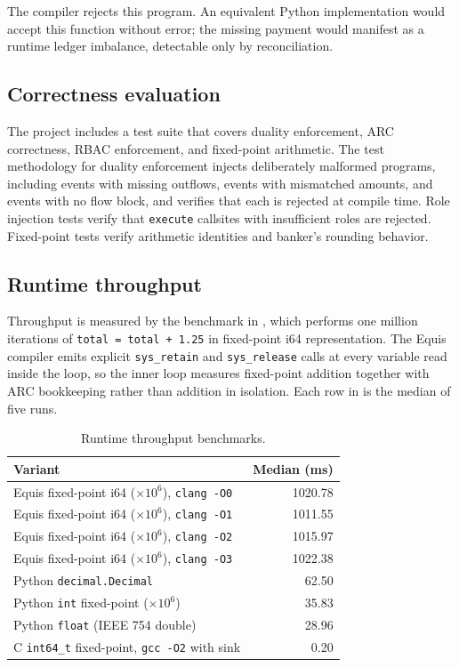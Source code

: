 \documentclass[11pt,a4paper]{article}
\theoremstyle{remark}
\begin{document}
The compiler rejects this program. An equivalent Python implementation
would accept this function without error; the missing payment would
manifest as a runtime ledger imbalance, detectable only by
reconciliation.

\subsection{Correctness evaluation}

The project includes a test suite that covers duality enforcement, ARC
correctness, RBAC enforcement, and fixed-point arithmetic. The test
methodology for duality enforcement injects deliberately malformed
programs, including events with missing outflows, events with
mismatched amounts, and events with no flow block, and verifies that
each is rejected at compile time. Role injection tests verify that
\texttt{execute} callsites with insufficient roles are rejected.
Fixed-point tests verify arithmetic identities and banker's rounding
behavior.

\subsection{Runtime throughput}

Throughput is measured by the benchmark in
, which performs one million
iterations of \texttt{total = total + 1.25} in fixed-point i64
representation. The Equis compiler emits explicit \texttt{sys\_retain}
and \texttt{sys\_release} calls at every variable read inside the loop,
so the inner loop measures fixed-point addition together with ARC
bookkeeping rather than addition in isolation. Each row in
 is the median of five runs.

\begin{table}[ht]
\caption{Runtime throughput benchmarks.}
\label{tab:throughput}
\centering
\small
\begin{tabular}{@{}lr@{}}
\toprule
Variant & Median (ms) \\
\midrule
Equis fixed-point i64 ($\times 10^{6}$), \texttt{clang -O0} & 1020.78 \\
Equis fixed-point i64 ($\times 10^{6}$), \texttt{clang -O1} & 1011.55 \\
Equis fixed-point i64 ($\times 10^{6}$), \texttt{clang -O2} & 1015.97 \\
Equis fixed-point i64 ($\times 10^{6}$), \texttt{clang -O3} & 1022.38 \\
Python \texttt{decimal.Decimal}                              &   62.50 \\
Python \texttt{int} fixed-point ($\times 10^{6}$)            &   35.83 \\
Python \texttt{float} (IEEE 754 double)                       &   28.96 \\
C \texttt{int64\_t} fixed-point, \texttt{gcc -O2} with sink  &    0.20 \\
\bottomrule
\end{tabular}
\end{table}
\end{document}

